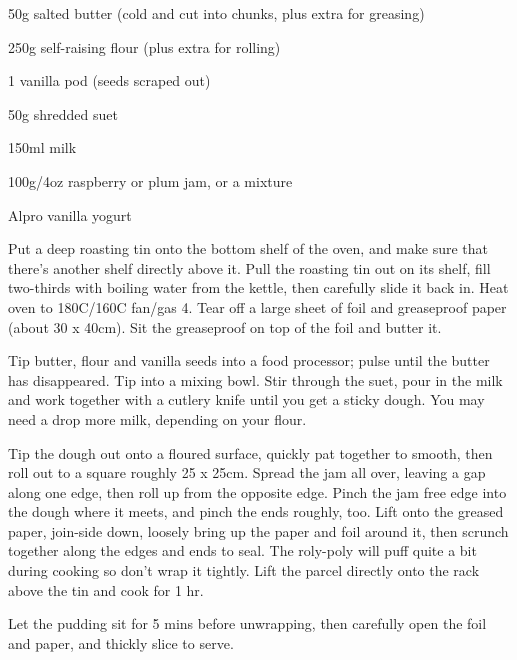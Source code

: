 \label{recipe:jam_roly_poly}


\begin{ingredients}

  \item 50g salted butter (cold and cut into chunks, plus extra for greasing)
  \item 250g self-raising flour (plus extra for rolling)
  \item 1 vanilla pod (seeds scraped out)
  \item 50g shredded suet
  \item 150ml milk
  \item 100g/4oz raspberry or plum jam, or a mixture
  \item Alpro vanilla yogurt
\end{ingredients}


\begin{method}
  	Put a deep roasting tin onto the bottom shelf of the oven, and make sure that
there’s another shelf directly above it. Pull the roasting tin out on its shelf,
fill two-thirds with boiling water from the kettle, then carefully slide it back
in. Heat oven to 180C/160C fan/gas 4. Tear off a large sheet of foil and
greaseproof paper (about 30 x 40cm). Sit the greaseproof on top of the foil
and butter it.

Tip butter, flour and vanilla seeds into a food processor; pulse until the
butter has disappeared. Tip into a mixing bowl. Stir through the suet, pour in
the milk and work together with a cutlery knife until you get a sticky dough.
You may need a drop more milk, depending on your flour.

Tip the dough out onto a floured surface, quickly pat together to smooth,
then roll out to a square roughly 25 x 25cm. Spread the jam all over, leaving
a gap along one edge, then roll up from the opposite edge. Pinch the jam
free edge into the dough where it meets, and pinch the ends roughly, too.
Lift onto the greased paper, join-side down, loosely bring up the paper and
foil around it, then scrunch together along the edges and ends to seal. The
roly-poly will puff quite a bit during cooking so don’t wrap it tightly. Lift
the parcel directly onto the rack above the tin and cook for 1 hr.

Let the pudding sit for 5 mins before unwrapping, then carefully open the
foil and paper, and thickly slice to serve.

  
\end{method}


